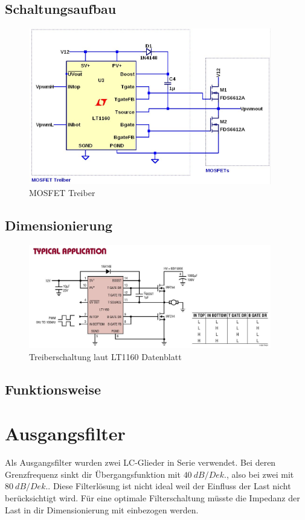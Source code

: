 \documentclass[11pt,a4paper,bibtotoc,oneside]{scrbook}
\begin{document}
\subsection{Schaltungsaufbau}
    \begin{figure}[ht]
    \centering
        \includegraphics[width=300pt]{./picture/treiber.png}
        \caption{\label{lm324}{MOSFET Treiber}}
    \end{figure}
\newpage
\subsection{Dimensionierung}
    \begin{figure}[ht]
    \centering
        \includegraphics[width=300pt]{./picture/treiber_orig.png}
        \caption{\label{lm324}{Treiberschaltung laut LT1160 Datenblatt}}
    \end{figure}
\subsection{Funktionsweise}

\section{Ausgangsfilter}
Als Ausgangsfilter wurden zwei LC-Glieder in Serie verwendet. Bei deren Grenzfrequenz sinkt dir Übergangsfunktion mit
$40\: dB/Dek.$, also bei zwei mit $80\: dB/Dek.$. Diese Filterlösung ist nicht ideal weil der Einfluss der Last nicht
berücksichtigt wird. Für eine optimale Filterschaltung müsste die Impedanz der Last in dir Dimensionierung mit
einbezogen werden.
\end{document}
